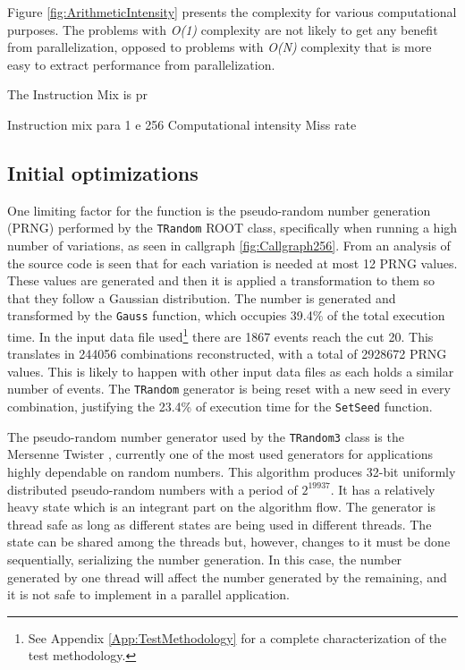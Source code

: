 Figure \ref{fig:ArithmeticIntensity} presents the complexity for various computational purposes. The problems with \textit{O(1)} complexity are not likely to get any benefit from parallelization, opposed to problems with \textit{O(N)} complexity that is more easy to extract performance from parallelization.

The Instruction Mix is pr

Instruction mix para 1 e 256
Computational intensity
Miss rate

\subsection{Initial optimizations}
\label{InitialOptimizations}

One limiting factor for the \ttDilepKinFit function is the pseudo-random number generation (PRNG) performed by the \texttt{TRandom} ROOT class, specifically when running a high number of variations, as seen in callgraph \ref{fig:Callgraph256}. From an analysis of the source code is seen that for each variation is needed at most 12 PRNG values. These values are generated and then it is applied a transformation to them so that they follow a Gaussian distribution. The number is generated and transformed by the \texttt{Gauss} function, which occupies 39.4\% of the total execution time. In the input data file used\footnote{See Appendix \ref{App:TestMethodology} for a complete characterization of the test methodology.} there are 1867 events reach the cut 20. This translates in 244056 combinations reconstructed, with a total of 2928672 PRNG values. This is likely to happen with other input data files as each holds a similar number of events. The \texttt{TRandom} generator is being reset with a new seed in every combination, justifying the 23.4\% of execution time for the \texttt{SetSeed} function.

The pseudo-random number generator used by the \texttt{TRandom3} class is the Mersenne Twister \cite{MersenneTwister}, currently one of the most used generators for applications highly dependable on random numbers. This algorithm produces 32-bit uniformly distributed pseudo-random numbers with a period of $2^{19937}$. It has a relatively heavy state which is an integrant part on the algorithm flow. The generator is thread safe as long as different states are being used in different threads. The state can be shared among the threads but, however, changes to it must be done sequentially, serializing the number generation. In this case, the number generated by one thread will affect the number generated by the remaining, and it is not safe to implement in a parallel application.

